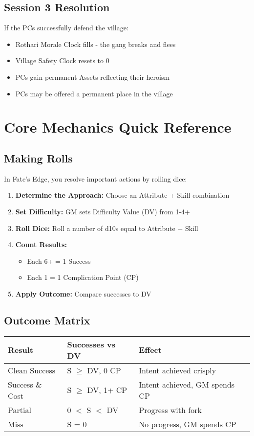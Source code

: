 \documentclass[11pt]{article}
\begin{document}
\subsection{Session 3 Resolution}

If the PCs successfully defend the village:
\begin{itemize}
\item Rothari Morale Clock fills - the gang breaks and flees
\item Village Safety Clock resets to 0
\item PCs gain permanent Assets reflecting their heroism
\item PCs may be offered a permanent place in the village
\end{itemize}

\section{Core Mechanics Quick Reference}

\subsection{Making Rolls}

In Fate's Edge, you resolve important actions by rolling dice:
\begin{enumerate}
\item \textbf{Determine the Approach:} Choose an Attribute + Skill combination
\item \textbf{Set Difficulty:} GM sets Difficulty Value (DV) from 1-4+
\item \textbf{Roll Dice:} Roll a number of d10s equal to Attribute + Skill
\item \textbf{Count Results:}
   \begin{itemize}
   \item Each 6+ = 1 Success
   \item Each 1 = 1 Complication Point (CP)
   \end{itemize}
\item \textbf{Apply Outcome:} Compare successes to DV
\end{enumerate}

\subsection{Outcome Matrix}

\begin{center}
\begin{tabular}{|l|l|l|}
\hline
\textbf{Result} & \textbf{Successes vs DV} & \textbf{Effect} \\
\hline
Clean Success & S $\geq$ DV, 0 CP & Intent achieved crisply \\
Success \& Cost & S $\geq$ DV, 1+ CP & Intent achieved, GM spends CP \\
Partial & 0 $<$ S $<$ DV & Progress with fork \\
Miss & S = 0 & No progress, GM spends CP \\
\hline
\end{tabular}
\end{center}
\end{document}

